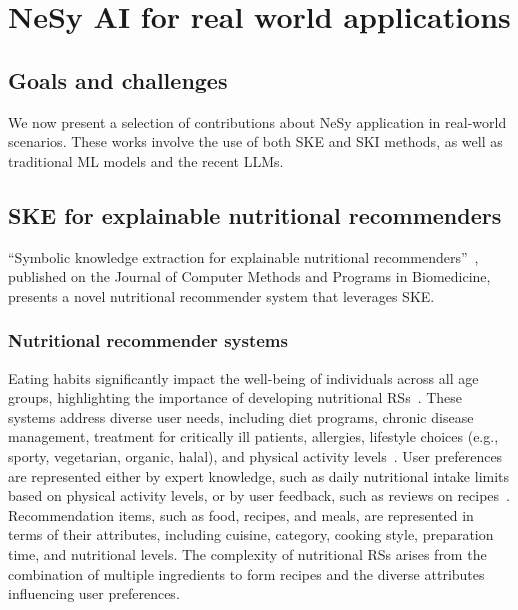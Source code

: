 
\chapter{NeSy AI for real world applications}
\label{ch:nesy-ai-for-real-world-applications}
\mtcaddchapter
\minitoc

\section{Goals and challenges}\label{sec:nesy-ai-goals-and-challenges}

%
We now present a selection of contributions about \gls{NeSy} application in real-world scenarios.
%
These works involve the use of both \gls{SKE} and \gls{SKI} methods, as well as traditional \gls{ML} models and the recent \glspl{LLM}.



\section{\Gls{SKE} for explainable nutritional recommenders}\label{sec:ske-for-explainable-nutritional-recommenders}
%
``Symbolic knowledge extraction for explainable nutritional recommenders''~\cite{DBLP:journals/cmpb/MagniniCCAO23}, published on the Journal of Computer Methods and Programs in Biomedicine, presents a novel nutritional recommender system that leverages \gls{SKE}.


\subsection{Nutritional recommender systems}\label{subsec:nutritional-recommender-systems}

Eating habits significantly impact the well-being of individuals across all age groups, highlighting the importance of developing nutritional \glspl{RS}~\cite{EspinHN2016,Cioara2018,Shandilya2022}.
%
These systems address diverse user needs, including diet programs, chronic disease management, treatment for critically ill patients, allergies, lifestyle choices (e.g., sporty, vegetarian, organic, halal), and physical activity levels~\cite{Saiz2021,Hezarjaribi2019,AgapitoSCCLGPFC2018,FraserT1990,Tran2018}.
%
User preferences are represented either by expert knowledge, such as daily nutritional intake limits based on physical activity levels, or by user feedback, such as reviews on recipes~\cite{10.1145/3418211}.
%
Recommendation items, such as food, recipes, and meals, are represented in terms of their attributes, including cuisine, category, cooking style, preparation time, and nutritional levels.
%
The complexity of nutritional \glspl{RS} arises from the combination of multiple ingredients to form recipes and the diverse attributes influencing user preferences.

